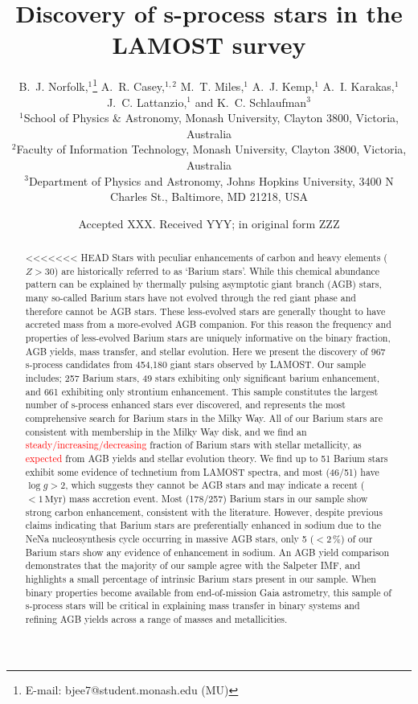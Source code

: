 \documentclass[a4paper,fleqn,usenatbib]{mnras}
\title[S-process stars in LAMOST]{Discovery of s-process stars in the LAMOST survey}
\author[B.~J. Norfolk et al.]{B.~J. Norfolk,$^{1}$\thanks{E-mail: bjee7@student.monash.edu (MU)}
A.~R. Casey,$^{1,2}$
M.~T. Miles,$^{1}$
A.~J. Kemp,$^{1}$ 
A.~I. Karakas,$^{1}$ \newauthor
J.~C. Lattanzio,$^{1}$
and K.~C. Schlaufman$^{3}$
\\
$^{1}$School of Physics \& Astronomy, Monash University, Clayton 3800, Victoria, Australia\\
$^{2}$Faculty of Information Technology, Monash University, Clayton 3800, Victoria, Australia\\
$^{3}$Department of Physics and Astronomy, Johns Hopkins University, 3400 N Charles St., Baltimore, MD 21218, USA
}
\date{Accepted XXX. Received YYY; in original form ZZZ}
\newcommand{\todo}[1]{\textcolor{red}{#1}}
\begin{document}
\label{firstpage}
\pagerange{\pageref{firstpage}--\pageref{lastpage}}
\maketitle

\begin{abstract}
<<<<<<< HEAD
Stars with peculiar enhancements of carbon and heavy elements ($Z > 30$) are historically referred to as `Barium stars'. While this chemical abundance pattern can be explained by thermally pulsing asymptotic giant branch (AGB) stars, many so-called Barium stars have not evolved through the red giant phase and therefore cannot be AGB stars. These less-evolved stars are generally thought to have accreted mass from a more-evolved AGB companion. For this reason the frequency and properties of less-evolved Barium stars are uniquely informative on the binary fraction, AGB yields, mass transfer, and stellar evolution. Here we present the discovery of 967 s-process candidates from 454,180 giant stars observed by LAMOST. Our sample includes; 257 Barium stars, 49 stars exhibiting only significant barium enhancement, and 661 exhibiting only strontium enhancement. This sample constitutes the largest number of s-process enhanced stars ever discovered, and represents the most comprehensive search for Barium stars in the Milky Way. All of our Barium stars are consistent with membership in the Milky Way disk, and we find an \todo{steady/increasing/decreasing} fraction of Barium stars with stellar metallicity, as \todo{expected} from AGB yields and stellar evolution theory. We find up to 51 Barium stars exhibit some evidence of technetium from LAMOST spectra, and most (46/51) have $\log{g} > 2$, which suggests they cannot be AGB stars and may indicate a recent ($<1\,\textrm{Myr}$) mass accretion event. Most (178/257) Barium stars in our sample show strong carbon enhancement, consistent with the literature. However, despite previous claims indicating that Barium stars are preferentially enhanced in sodium due to the NeNa nucleosynthesis cycle occurring in massive AGB stars, only 5 ($<2$\,\%) of our Barium stars show any evidence of enhancement in sodium. An AGB yield comparison demonstrates that the majority of our sample agree with the Salpeter IMF, and highlights a small percentage of intrinsic Barium stars present in our sample. When binary properties become available from end-of-mission Gaia astrometry, this sample of s-process stars will be critical in explaining mass transfer in binary systems and refining AGB yields across a range of masses and metallicities.

\end{abstract}
\end{document}
